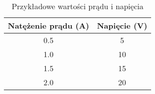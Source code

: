 \begin{table}[h]
    \centering
    \caption{Przykładowe wartości prądu i napięcia}
    \begin{tabular}{|c|c|}
        \hline
        Natężenie prądu (A) & Napięcie (V) \\
        \hline
        0.5 & 5 \\
        1.0 & 10 \\
        1.5 & 15 \\
        2.0 & 20 \\
        \hline
    \end{tabular}
    \label{tab:prad_napiecie}
\end{table}